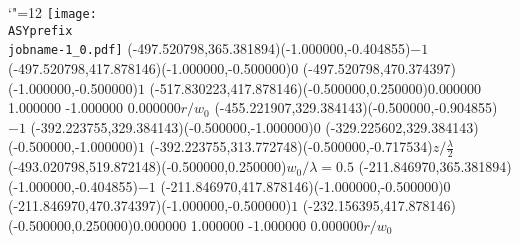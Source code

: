 \setlength{\unitlength}{1pt}
\makeatletter%
\let\ASYencoding\f@encoding%
\let\ASYfamily\f@family%
\let\ASYseries\f@series%
\let\ASYshape\f@shape%
\makeatother%
{\catcode`"=12%
\texttt{[image: \\ASYprefix\\jobname-1\_0.pdf]}%
}%
\color{ASYcolor}
\fontsize{12.000000}{14.400000}\selectfont
\usefont{\ASYencoding}{\ASYfamily}{\ASYseries}{\ASYshape}%
\ASYalign(-497.520798,365.381894)(-1.000000,-0.404855){\vphantom{$10^4$}$-1$}
\color{ASYcolor}
\fontsize{12.000000}{14.400000}\selectfont
\ASYalign(-497.520798,417.878146)(-1.000000,-0.500000){\vphantom{$10^4$}$0$}
\color{ASYcolor}
\fontsize{12.000000}{14.400000}\selectfont
\ASYalign(-497.520798,470.374397)(-1.000000,-0.500000){\vphantom{$10^4$}$1$}
\color{ASYcolor}
\fontsize{12.000000}{14.400000}\selectfont
\ASYalignT(-517.830223,417.878146)(-0.500000,0.250000){0.000000 1.000000 -1.000000 0.000000}{{\Large $r/w_0$}}
\color{ASYcolor}
\fontsize{12.000000}{14.400000}\selectfont
\ASYalign(-455.221907,329.384143)(-0.500000,-0.904855){\vphantom{$10^4$}$-1$}
\color{ASYcolor}
\fontsize{12.000000}{14.400000}\selectfont
\ASYalign(-392.223755,329.384143)(-0.500000,-1.000000){\vphantom{$10^4$}$0$}
\color{ASYcolor}
\fontsize{12.000000}{14.400000}\selectfont
\ASYalign(-329.225602,329.384143)(-0.500000,-1.000000){\vphantom{$10^4$}$1$}
\color{ASYcolor}
\fontsize{12.000000}{14.400000}\selectfont
\ASYalign(-392.223755,313.772748)(-0.500000,-0.717534){{\Large $z/\frac{\lambda}{2}$}}
\color{ASYcolor}
\fontsize{12.000000}{14.400000}\selectfont
\ASYalign(-493.020798,519.872148)(-0.500000,0.250000){{\LARGE $w_0/\lambda=0.5$}}
\color{ASYcolor}
\fontsize{12.000000}{14.400000}\selectfont
\ASYalign(-211.846970,365.381894)(-1.000000,-0.404855){\vphantom{$10^4$}$-1$}
\color{ASYcolor}
\fontsize{12.000000}{14.400000}\selectfont
\ASYalign(-211.846970,417.878146)(-1.000000,-0.500000){\vphantom{$10^4$}$0$}
\color{ASYcolor}
\fontsize{12.000000}{14.400000}\selectfont
\ASYalign(-211.846970,470.374397)(-1.000000,-0.500000){\vphantom{$10^4$}$1$}
\color{ASYcolor}
\fontsize{12.000000}{14.400000}\selectfont
\ASYalignT(-232.156395,417.878146)(-0.500000,0.250000){0.000000 1.000000 -1.000000 0.000000}{{\Large $r/w_0$}}
